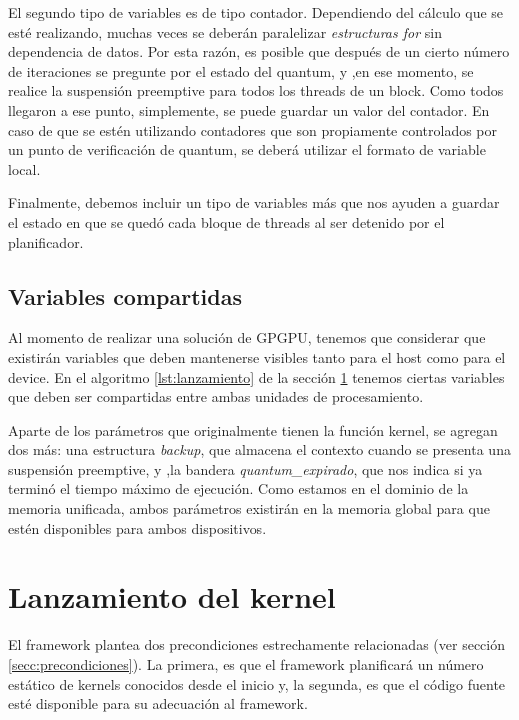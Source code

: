 El segundo tipo de variables es de tipo contador. Dependiendo del cálculo que se esté realizando, muchas veces se deberán paralelizar \textit{estructuras for} sin dependencia de datos.  Por esta razón, es posible que después de un cierto número de iteraciones se pregunte por el estado del quantum, y ,en ese momento, se realice la suspensión preemptive para todos los threads de un block. Como todos llegaron a ese punto, simplemente, se puede  guardar un valor del contador. En caso de que se estén utilizando contadores que son propiamente controlados por un punto de verificación de quantum, se deberá utilizar el formato de variable local.
\newline

Finalmente, debemos incluir un tipo de variables más que nos ayuden a guardar el estado en que se quedó cada bloque de threads al ser detenido por el planificador.

  \subsection{Variables compartidas}
  
  Al momento de realizar una solución de GPGPU, tenemos que  considerar que existirán variables que deben mantenerse visibles tanto para el host como para el device. En el algoritmo \ref{lst:lanzamiento} de la sección \ref{secc:lanzamientoKernel} tenemos ciertas variables que deben ser compartidas entre ambas unidades de procesamiento. 
    \newline
  
  Aparte de los parámetros que originalmente tienen la función kernel, se agregan dos más: una estructura \textit{backup}, que almacena el contexto cuando se presenta una suspensión preemptive, y ,la bandera \textit{quantum\_expirado}, que nos indica si ya terminó el tiempo máximo de ejecución. Como estamos en el dominio de la memoria unificada, ambos parámetros existirán en la memoria global para que estén disponibles para ambos dispositivos.
  
  

\section{Lanzamiento del kernel}\label{secc:lanzamientoKernel}

El framework plantea dos precondiciones estrechamente relacionadas (ver sección \ref{secc:precondiciones}). La primera, es que el framework planificará un número estático de kernels conocidos desde el inicio y, la segunda, es que el código fuente esté disponible para su adecuación al framework.
\newline

